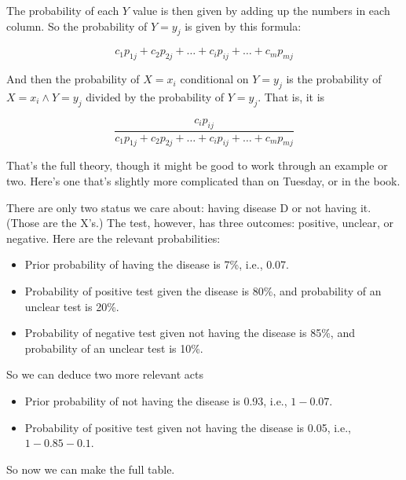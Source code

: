 \documentclass[11pt,]{article}
\providecommand{\tightlist}{%
  \setlength{\itemsep}{0pt}\setlength{\parskip}{0pt}}
\begin{document}
The probability of each \(Y\) value is then given by adding up the
numbers in each column. So the probability of \(Y = y_j\) is given by
this formula:

\[
c_1p_{1j} + c_2p_{2j} + \dots + c_ip_{ij} + \dots + c_mp_{mj}
\]

And then the probability of \(X = x_i\) conditional on \(Y = y_j\) is
the probability of \(X = x_i \wedge Y = y_j\) divided by the probability
of \(Y = y_j\). That is, it is

\[
\frac{c_ip_{ij}}{c_1p_{1j} + c_2p_{2j} + \dots + c_ip_{ij} + \dots + c_mp_{mj}}
\]

That's the full theory, though it might be good to work through an
example or two. Here's one that's slightly more complicated than on
Tuesday, or in the book.

There are only two status we care about: having disease D or not having
it. (Those are the X's.) The test, however, has three outcomes:
positive, unclear, or negative. Here are the relevant probabilities:

\begin{itemize}
\tightlist
\item
  Prior probability of having the disease is 7\%, i.e., 0.07.
\item
  Probability of positive test given the disease is 80\%, and
  probability of an unclear test is 20\%.
\item
  Probability of negative test given not having the disease is 85\%, and
  probability of an unclear test is 10\%.
\end{itemize}

So we can deduce two more relevant acts

\begin{itemize}
\tightlist
\item
  Prior probability of not having the disease is 0.93, i.e.,
  \(1 - 0.07\).
\item
  Probability of positive test given not having the disease is 0.05,
  i.e., \(1 - 0.85 - 0.1\).
\end{itemize}

So now we can make the full table.
\end{document}
